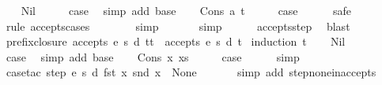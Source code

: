 \begin{isabellebody}
\ \ \isamarkupfalse%
\ Nil\isanewline
\ \ \isamarkupfalse%
\ \isamarkupfalse%
\ {\isacharquery}case\ \isamarkupfalse%
\ {\isacharparenleft}simp\ add{\isacharcolon}\ base{\isacharparenright}\isanewline
{}\isamarkupfalse%
\isanewline
\ \ \isamarkupfalse%
\ {\isacharparenleft}Cons\ a\ t{\isacharparenright}\isanewline
\ \ \isamarkupfalse%
\ \isamarkupfalse%
\ {\isacharquery}case\isanewline
\ \ \ \ \isamarkupfalse%
\ safe\isanewline
\ \ \ \ \isamarkupfalse%
\ {\isacharparenleft}rule\ accepts{\isachardot}cases{\isacharparenright}\isanewline
\ \ \ \ \ \ \isamarkupfalse%
\ simp\isanewline
\ \ \ \ \ \isamarkupfalse%
\ simp\isanewline
\ \ \ \ \isamarkupfalse%
\ accepts{\isachardot}step\ \isamarkupfalse%
\ blast\isanewline
{}\isamarkupfalse%
%
\endisatagproof
{\isafoldproof}%
%
\isadelimproof
\isanewline
%
\endisadelimproof
\isanewline
{}\isamarkupfalse%
\ prefix{\isacharunderscore}closure{\isacharcolon}\ {\isachardoublequoteopen}accepts\ e\ s\ d\ {\isacharparenleft}t{\isacharat}t{\isacharprime}{\isacharparenright}\ {\isasymLongrightarrow}\ accepts\ e\ s\ d\ t{\isachardoublequoteclose}\isanewline
%
\isadelimproof
%
\endisadelimproof
%
\isatagproof
{}\isamarkupfalse%
\ {\isacharparenleft}induction\ {\isachardoublequoteopen}t{\isachardoublequoteclose}{\isacharparenright}\isanewline
\ \ \isamarkupfalse%
\ Nil\isanewline
\ \ \isamarkupfalse%
\ \isamarkupfalse%
\ {\isacharquery}case\ \isamarkupfalse%
\ {\isacharparenleft}simp\ add{\isacharcolon}\ base{\isacharparenright}\isanewline
{}\isamarkupfalse%
\isanewline
\ \ \isamarkupfalse%
\ {\isacharparenleft}Cons\ x\ xs{\isacharparenright}\isanewline
\ \ \isamarkupfalse%
\ \isamarkupfalse%
\ {\isacharquery}case\isanewline
\ \ \ \ \isamarkupfalse%
\ simp\isanewline
\ \ \ \ \isamarkupfalse%
\ {\isacharparenleft}case{\isacharunderscore}tac\ {\isachardoublequoteopen}step\ e\ s\ d\ {\isacharparenleft}fst\ x{\isacharparenright}\ {\isacharparenleft}snd\ x{\isacharparenright}\ {\isacharequal}\ None{\isachardoublequoteclose}{\isacharparenright}\isanewline
\ \ \ \ \ \isamarkupfalse%
\ {\isacharparenleft}simp\ add{\isacharcolon}\ step{\isacharunderscore}none{\isacharunderscore}inaccepts{\isacharparenright}\isanewline

\end{isabellebody}
